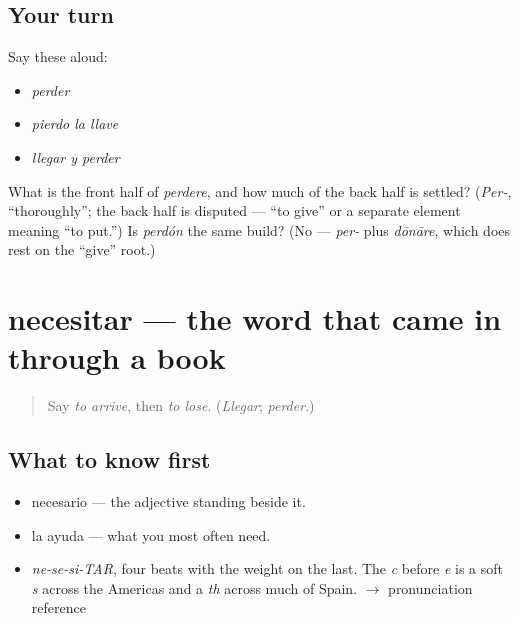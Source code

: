 \subsection*{Your turn}
Say these aloud:

\begin{itemize}
\raggedright
  \item \emph{perder}
  \item \emph{pierdo la llave}
  \item \emph{llegar y perder}
\end{itemize}

\begin{tcolorbox}[breakable,colback=teal!4,colframe=teal!35!black,title={Before you move on}]
What is the front half of \emph{perdere}, and how much of the back half is settled? (\emph{Per-}, \textquotedblleft{}thoroughly\textquotedblright{}; the back half is disputed — \textquotedblleft{}to give\textquotedblright{} or a separate element meaning \textquotedblleft{}to put.\textquotedblright{}) Is \emph{perdón} the same build? (No — \emph{per-} plus \emph{dōnāre}, which does rest on the \textquotedblleft{}give\textquotedblright{} root.)
\end{tcolorbox}
\section[necesitar]{necesitar — the word that came in through a book}

\label{lesson:ES-C395-necesitar}



\begin{quote}
Say \emph{to arrive}, then \emph{to lose}. (\emph{Llegar}; \emph{perder}.)
\end{quote}

\subsection*{What to know first}
\begin{itemize}
\raggedright
  \item necesario — the adjective standing beside it.
  \item la ayuda — what you most often need.
\end{itemize}

\begin{sounds}
\begin{itemize}
\raggedright
  \item \emph{ne-se-si-TAR}, four beats with the weight on the last. The \emph{c} before \emph{e} is a soft \emph{s} across the Americas and a \emph{th} across much of Spain. $\to$ pronunciation reference
\end{itemize}
\end{sounds}

